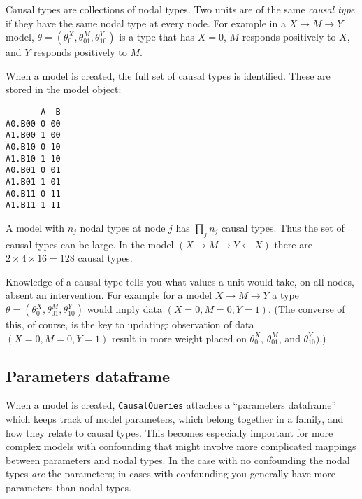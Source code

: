 \documentclass[
  12pt,
]{book}
\newenvironment{Shaded}{\begin{snugshade}}{\end{snugshade}}
\newcommand{\KeywordTok}[1]{\textcolor[rgb]{0.13,0.29,0.53}{\textbf{#1}}}
\newcommand{\NormalTok}[1]{#1}
\newcommand{\OperatorTok}[1]{\textcolor[rgb]{0.81,0.36,0.00}{\textbf{#1}}}
\newcommand{\StringTok}[1]{\textcolor[rgb]{0.31,0.60,0.02}{#1}}
\begin{document}
Causal types are collections of nodal types. Two units are of the same \emph{causal type} if they have the same nodal type at every node. For example in a \(X \rightarrow M \rightarrow Y\) model, \(\theta = (\theta^X_0, \theta^M_{01}, \theta^Y_{10})\) is a type that has \(X=0\), \(M\) responds positively to \(X\), and \(Y\) responds positively to \(M\).

When a model is created, the full set of causal types is identified. These are stored in the model object:

\begin{Shaded}
\end{Shaded}

\begin{verbatim}
       A  B
A0.B00 0 00
A1.B00 1 00
A0.B10 0 10
A1.B10 1 10
A0.B01 0 01
A1.B01 1 01
A0.B11 0 11
A1.B11 1 11
\end{verbatim}

A model with \(n_j\) nodal types at node \(j\) has \(\prod_jn_j\) causal types. Thus the set of causal types can be large. In the model \((X\rightarrow M \rightarrow Y \leftarrow X)\) there are \(2\times 4\times 16 = 128\) causal types.

Knowledge of a causal type tells you what values a unit would take, on all nodes, absent an intervention. For example for a model \(X \rightarrow M \rightarrow Y\) a type \(\theta = (\theta^X_0, \theta^M_{01}, \theta^Y_{10})\) would imply data \((X=0, M=0, Y=1)\). (The converse of this, of course, is the key to updating: observation of data \((X=0, M=0, Y=1)\) result in more weight placed on \(\theta^X_0\), \(\theta^M_{01}\), and \(\theta^Y_{10})\).)

\hypertarget{parameters-dataframe}{%
\subsection{Parameters dataframe}\label{parameters-dataframe}}

When a model is created, \texttt{CausalQueries} attaches a ``parameters dataframe'' which keeps track of model parameters, which belong together in a family, and how they relate to causal types. This becomes especially important for more complex models with confounding that might involve more complicated mappings between parameters and nodal types. In the case with no confounding the nodal types \emph{are} the parameters; in cases with confounding you generally have more parameters than nodal types.
\end{document}
